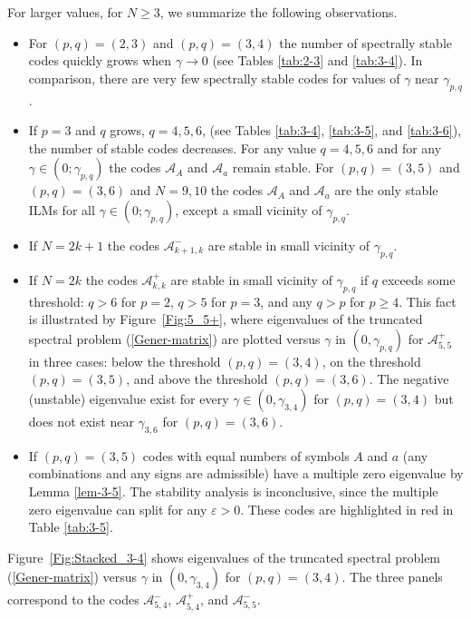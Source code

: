 \documentclass[12pt,reqno]{amsart}
\begin{document}
For larger values, for $N \geq 3$, we summarize the following observations. 
\begin{itemize}
\item For $(p,q)=(2,3)$ and $(p,q)=(3,4)$ the number of spectrally stable codes  quickly grows when $\gamma \to 0$ (see Tables \ref{tab:2-3} and \ref{tab:3-4}). In comparison, there are very few spectrally stable codes for values of $\gamma$ near $\gamma_{p,q}$.

\item If $p=3$ and $q$ grows, $q=4,5,6$,   (see Tables \ref{tab:3-4}, \ref{tab:3-5}, and \ref{tab:3-6}), the number of stable codes decreases. For any value $q=4,5,6$ and for any $\gamma\in(0;\gamma_{p,q})$  the codes $\mathcal{A}_A$ and $\mathcal{A}_a$ remain stable. For $(p,q)=(3,5)$ and $(p,q)=(3,6)$ and $N=9, 10$ the codes $\mathcal{A}_A$ and $\mathcal{A}_a$ are the only stable ILMs for all $\gamma\in(0;\gamma_{p,q})$, except a small vicinity of $\gamma_{p,q}$.

\item If $N=2k+1$ the codes  $\mathcal{A}_{k+1,k}^-$ are  stable in small vicinity of $\gamma_{p,q}$.

\item If $N=2k$ the codes $\mathcal{A}_{k,k}^+$ are stable in small vicinity of $\gamma_{p,q}$ if $q$ exceeds some threshold: $q > 6$ for $p = 2$, 
$q > 5$ for $p = 3$, and any $q > p$ for $p \geq 4$. This fact is illustrated by Figure~\ref{Fig:5_5+}, where eigenvalues of the truncated spectral problem (\ref{Gener-matrix}) are plotted versus $\gamma$ in $(0,\gamma_{p,q})$ for $\mathcal{A}_{5,5}^+$ in three cases: below the threshold $(p,q)=(3,4)$, on the threshold  $(p,q)=(3,5)$, and above the threshold $(p,q)=(3,6)$. The negative (unstable) eigenvalue exist for every $\gamma \in (0,\gamma_{3,4})$ for $(p,q) = (3,4)$ but does not exist near $\gamma_{3,6}$ for $(p,q) = (3,6)$. 

\item If $(p,q)=(3,5)$ codes with equal numbers of symbols $A$ and $a$ (any combinations and any signs are admissible) have a multiple zero eigenvalue by Lemma \ref{lem-3-5}. The stability analysis is inconclusive, since the multiple zero eigenvalue can split for any $\varepsilon>0$. These codes are highlighted in red in Table \ref{tab:3-5}.
\end{itemize}

Figure~\ref{Fig:Stacked_3-4} shows eigenvalues of the truncated spectral problem (\ref{Gener-matrix}) versus $\gamma$ in $(0,\gamma_{3,4})$ for $(p,q)=(3,4)$. 
The three panels correspond to the codes $\mathcal{A}_{5,4}^-$, $\mathcal{A}_{5,4}^+$, and $\mathcal{A}_{5,5}^-$. 
\end{document}
